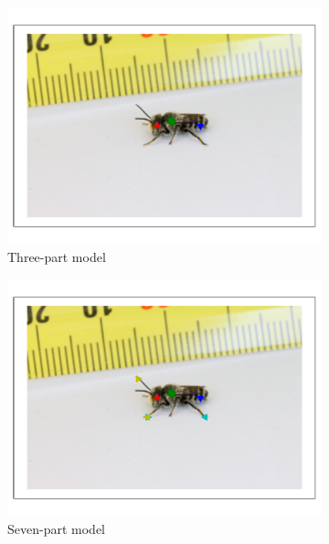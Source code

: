 \documentclass[11pt, oneside]{report}
\begin{document}
        \begin{figure}[p]
            \centering
            \begin{subfigure}[b]{0.45\textwidth}
                \centering
                \includegraphics[width=\textwidth]{hog4_3.pdf}
                \caption{Three-part model}
            \end{subfigure}
            \begin{subfigure}[b]{0.45\textwidth}
                \centering
                \includegraphics[width=\textwidth]{7p_3.pdf}
                \caption{Seven-part model}
            \end{subfigure}\\
            \begin{subfigure}[b]{0.45\textwidth}

\end{subfigure}
\end{figure}
\end{document}
